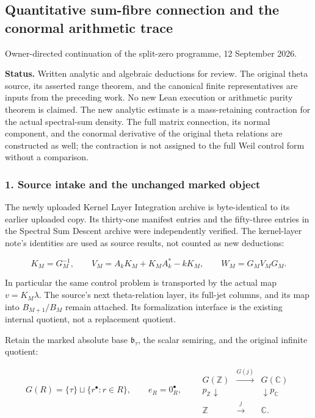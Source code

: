 


\subsection{Quantitative sum-fibre connection and the conormal arithmetic
trace}\label{sum_connection:quantitative-sum-fibre-connection-and-the-conormal-arithmetic-trace}

Owner-directed continuation of the split-zero programme, 12 September
2026.

\textbf{Status.} Written analytic and algebraic deductions for review.
The original theta source, its asserted range theorem, and the canonical
finite representatives are inputs from the preceding work. No new Lean
execution or arithmetic purity theorem is claimed. The new analytic
estimate is a mass-retaining contraction for the actual spectral-sum
density. The full matrix connection, its normal component, and the
conormal derivative of the original theta relations are constructed as
well; the contraction is not assigned to the full Weil control form
without a comparison.

\subsubsection{1. Source intake and the unchanged marked
object}\label{sum_connection:source-intake-and-the-unchanged-marked-object}

The newly uploaded Kernel Layer Integration archive is byte-identical to
its earlier uploaded copy. Its thirty-one manifest entries and the
fifty-three entries in the Spectral Sum Descent archive were
independently verified. The kernel-layer note's identities are used as
source results, not counted as new deductions:

\[K_M=G_M^{-1},\qquad V_M=A_kK_M+K_MA_k^*-kK_M,\qquad W_M=G_MV_MG_M.\tag{1.1}\]

In particular the same control problem is transported by the actual map
\(v=K_M\lambda\). The source's next theta-relation layer, its full-jet
columns, and its map into \(B_{M+1}/B_M\) remain attached. Its
formalization interface is the existing internal quotient, not a
replacement quotient.

Retain the marked absolute base \(\mathfrak b_\tau\), the scalar
semiring, and the original infinite quotient:

\[G(R)=\{\tau\}\sqcup\{r^\bullet:r\in R\},\qquad e_R=0_R^\bullet,\qquad
\begin{array}{ccc}G(\mathbb Z)&\xrightarrow{G(j)}&G(\mathbb C)\\
p_{\mathbb Z}\downarrow&&\downarrow p_{\mathbb C}\\
\mathbb Z&\xrightarrow{j}&\mathbb C.
\end{array}\tag{1.2}\]


